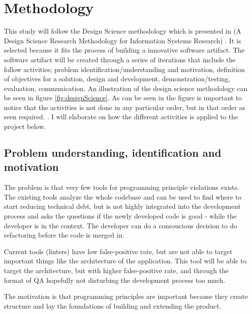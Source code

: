 \documentclass{article}
\begin{document}
\section{Methodology}
\label{methodology}
This study will follow the Design Science methodology which is presented in (A Design Science Research Methodology for Information Systems Research) \cite{10.2753/MIS0742-1222240302}. It is selected because it fits the process of building a innovative software artifact. The software artifact will be created through a series of iterations that include the follow activities; problem identification/understanding and motivation, definition of objectives for a solution, design and development, demonstration/testing, evaluation, communication.  An illustration of the design science methodology can be seen in figure \ref{fig:designScience}. As can be seen in the figure is important to notice that the activities is not done in any particular order, but in that order as seen required.  . I will elaborate on how the different activities is applied to the project below. 

\subsection{Problem understanding, identification and motivation}

The problem is that very few tools for programming principle violations exists. The existing tools analyze the whole codebase and can be used to find where to start reducing technical debt, but is not highly integrated into the development process and asks the questions if the newly developed code is good - while the developer is in the context. The developer can do a consoucious decision to do refactoring before the code is merged in. 

Current tools (linters) have low false-positive rate, but are not able to target important things like the architecture of the application. This tool will be able to target the architecture, but with higher false-positive rate, and through the format of QA hopefully not disturbing the development process too much. 


The motivation is that programming principles are important because they create structure and lay the foundations of building and extending the product.
\end{document}
